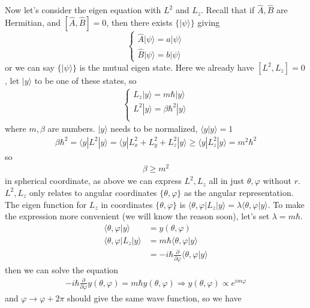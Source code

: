 \documentclass[UTF8,12pt]{article} %
\numberwithin{equation}{section}
\begin{document}
Now let's consider the eigen equation with $L^{2}$ and $L_{z}$. Recall that if $\hat{A}, \hat{B}$ are Hermitian, and $[\hat{A}, \hat{B}] = 0$, then there exists $\{|\psi\rangle\}$ giving
$$\begin{cases}\hat{A}|\psi\rangle = a|\psi\rangle \\ \hat{B}|\psi\rangle = b|\psi\rangle\end{cases}$$
or we can say $\{|\psi\rangle\}$ is the mutual eigen state. Here we already have $[L^{2}, L_{z}] = 0$, let $|y\rangle$ to be one of these states, so
\begin{align}
\begin{cases}
L_{z}|y\rangle = m\hbar|y\rangle \\
L^{2}|y\rangle = \beta\hbar^{2}|y\rangle \\
\end{cases}
\end{align}
where $m,\beta$ are numbers. $|y\rangle$ needs to be normalized, $\langle y|y\rangle = 1$
\begin{align}
\beta\hbar^{2} = \langle y|L^{2}|y\rangle = \langle y|L_{x}^{2} + L_{y}^{2} + L_{z}^{2}|y\rangle \ge \langle y|L_{z}^{2}|y\rangle = m^{2}\hbar^{2}
\end{align}
so
\begin{align}
\beta \ge m^{2}
\end{align}
    in spherical coordinate, as above we can express $L^{2}, L_{z}$ all in just $\theta, \varphi$ without $r$. $L^{2}, L_{z}$ only relates to angular coordinates $\{\theta, \varphi\}$ as the angular representation. The eigen function for $L_{z}$ in coordinates $\{\theta, \varphi\}$ is $\langle\theta,\varphi|L_{z}|y\rangle = \lambda\langle\theta,\varphi|y\rangle$. To make the expression more convenient (we will know the reason soon), let's set $\lambda = m\hbar$.
\begin{align}
\langle\theta, \varphi|y\rangle &= y(\theta, \varphi) \\
\langle\theta,\varphi|L_{z}|y\rangle &= m\hbar\langle\theta,\varphi|y\rangle \\
&= -i\hbar\frac{\partial}{\partial\varphi}\langle\theta,\varphi|y\rangle
\end{align}
then we can solve the equation
\begin{align}
-i\hbar\frac{\partial}{\partial\varphi} y(\theta,\varphi) = m\hbar y(\theta,\varphi) \Rightarrow y(\theta,\varphi) \propto e^{im\varphi}
\label{Lz}
\end{align}
and $\varphi \rightarrow \varphi + 2\pi$ should give the same wave function, so we have
\end{document}

